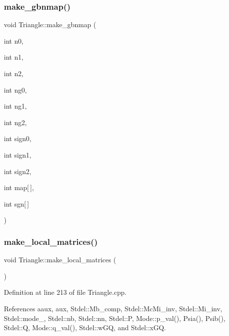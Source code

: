 \mbox{\label{classTriangle_a87bdc01aefd328ef819f0b2f8c6448dc}} 
\subsubsection{\texorpdfstring{make\+\_\+gbnmap()}{make\_gbnmap()}}
{\footnotesize\ttfamily void Triangle\+::make\+\_\+gbnmap (\begin{DoxyParamCaption}\item[{int}]{n0,  }\item[{int}]{n1,  }\item[{int}]{n2,  }\item[{int}]{ng0,  }\item[{int}]{ng1,  }\item[{int}]{ng2,  }\item[{int}]{sign0,  }\item[{int}]{sign1,  }\item[{int}]{sign2,  }\item[{int}]{map\mbox{[}$\,$\mbox{]},  }\item[{int}]{sgn\mbox{[}$\,$\mbox{]} }\end{DoxyParamCaption})}

\mbox{\label{classTriangle_a0266527176e45c12a896110a8e5e20f8}} 
\subsubsection{\texorpdfstring{make\+\_\+local\+\_\+matrices()}{make\_local\_matrices()}}
{\footnotesize\ttfamily void Triangle\+::make\+\_\+local\+\_\+matrices (\begin{DoxyParamCaption}{ }\end{DoxyParamCaption})}



Definition at line 213 of file Triangle.\+cpp.



References aaux, aux, Stdel\+::\+Mb\+\_\+comp, Stdel\+::\+Mc\+Mi\+\_\+inv, Stdel\+::\+Mi\+\_\+inv, Stdel\+::mode\+\_\+, Stdel\+::nb, Stdel\+::nn, Stdel\+::P, Mode\+::p\+\_\+val(), Psia(), Psib(), Stdel\+::Q, Mode\+::q\+\_\+val(), Stdel\+::w\+GQ, and Stdel\+::x\+GQ.


